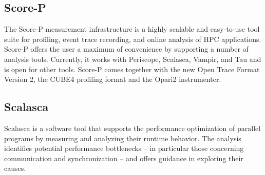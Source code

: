 \subsection{Score-P}
\label{sec:scorep}
The Score-P measurement infrastructure is a highly scalable and easy-to-use tool suite for profiling, event trace recording, and online analysis of HPC applications. Score-P offers the user a maximum of convenience by supporting a number of analysis tools. Currently, it works with Periscope, Scalasca, Vampir, and Tau and is open for other tools. Score-P comes together with the new Open Trace Format Version 2, the CUBE4 profiling format and the Opari2 instrumenter.  \cite{scorep}

\subsection{Scalasca}
\label{sec:scorep}
Scalasca is a software tool that supports the performance optimization of parallel programs by measuring and analyzing their runtime behavior. The analysis identifies potential performance bottlenecks – in particular those concerning communication and synchronization – and offers guidance in exploring their causes. \cite{scalasca}
